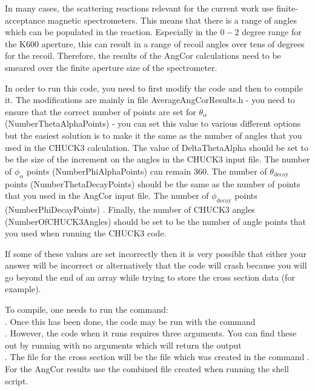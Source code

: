 \documentclass[a4paper,10pt]{article}
\begin{document}
In many cases, the scattering reactions relevant for the current work use finite-acceptance magnetic spectrometers. This means that there is a range of angles which can be populated in the reaction. Especially in the $0-2$ degree range for the K600 aperture, this can result in a range of recoil angles over tens of degrees for the recoil. Therefore, the results of the AngCor calculations need to be smeared over the finite aperture size of the spectrometer.

In order to run this code, you need to first modify the code and then to compile it. The modifications are mainly in file AverageAngCorResults.h - you need to ensure that the correct number of points are set for $\theta_\alpha$ (NumberThetaAlphaPoints) - you can set this value to various different options but the easiest solution is to make it the same as the number of angles that you used in the CHUCK3 calculation. The value of DeltaThetaAlpha should be set to be the size of the increment on the angles in the CHUCK3 input file. The number of $\phi_\alpha$ points (NumberPhiAlphaPoints) can remain 360. The number of $\theta_\mathrm{decay}$ points (NumberThetaDecayPoints) should be the same as the number of points that you used in the AngCor input file. The number of $\phi_\mathrm{decay}$ points (NumberPhiDecayPoints) . Finally, the number of CHUCK3 angles (NumberOfCHUCK3Angles) should be set to be the number of angle points that you used when running the CHUCK3 code.

If some of these values are set incorrectly then it is very possible that either your answer will be incorrect or alternatively that the code will crash because you will go beyond the end of an array while trying to store the cross section data (for example).

To compile, one needs to run the command:\\
. Once this has been done, the code may be run with the command\\ . However, the code when it runs requires three arguments. You can find these out by running  with no arguments which will return the output\\ . The file for the cross section will be the file which was created in the command . For the AngCor results use the combined file created when running the  shell script.
 
\end{document}
